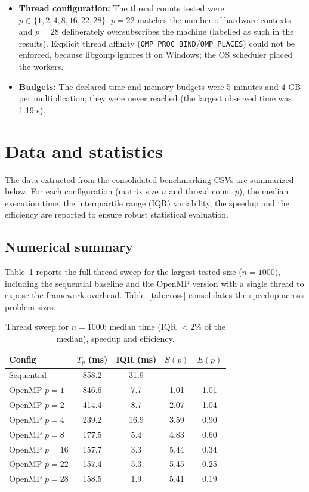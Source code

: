\documentclass[12pt,a4paper]{article}
\begin{document}
\begin{itemize}
2 low-power E-cores = 16 physical cores / 22 hardware threads, P-cores up to
4.8 GHz; RAM 32 GB; OS Windows 11; compiler gcc 16.2.0 (MSYS2) with flags
\texttt{-O3 -fopenmp}. Python 3.12 was used for input generation and
analysis (numpy, pandas, matplotlib).
\item \textbf{Thread configuration:} The thread counts tested were
$p \in \{1, 2, 4, 8, 16, 22, 28\}$: $p = 22$ matches the number of hardware
contexts and $p = 28$ deliberately oversubscribes the machine (labelled as
such in the results). Explicit thread affinity
(\texttt{OMP\_PROC\_BIND}/\texttt{OMP\_PLACES}) could not be enforced,
because libgomp ignores it on Windows; the OS scheduler placed the workers.
\item \textbf{Budgets:} The declared time and memory budgets were 5 minutes
and 4 GB per multiplication; they were never reached (the largest observed
time was 1.19 s).
\end{itemize}

\section{Data and statistics}
\label{sec:data}

The data extracted from the consolidated benchmarking CSVs are summarized
below. For each configuration (matrix size $n$ and thread count $p$), the
median execution time, the interquartile range (IQR) variability, the
speedup and the efficiency are reported to ensure robust statistical
evaluation.

\subsection{Numerical summary}
\label{sec:numsummary}

Table~\ref{tab:sweep} reports the full thread sweep for the largest tested
size ($n = 1000$), including the sequential baseline and the OpenMP version
with a single thread to expose the framework overhead.
Table~\ref{tab:cross} consolidates the speedup across problem sizes.

\begin{table}[h]
\centering
\caption{Thread sweep for $n = 1000$: median time (IQR $< 2\%$ of the
median), speedup and efficiency.}
\label{tab:sweep}
\begin{tabular}{@{}lcccc@{}}
\toprule
Config & $T_p$ (ms) & IQR (ms) & $S(p)$ & $E(p)$ \\
\midrule
Sequential & 858.2 & 31.9 & --- & --- \\
OpenMP $p=1$ & 846.6 & 7.7 & 1.01 & 1.01 \\
OpenMP $p=2$ & 414.4 & 8.7 & 2.07 & 1.04 \\
OpenMP $p=4$ & 239.2 & 16.9 & 3.59 & 0.90 \\
OpenMP $p=8$ & 177.5 & 5.4 & 4.83 & 0.60 \\
OpenMP $p=16$ & 157.7 & 3.3 & 5.44 & 0.34 \\
OpenMP $p=22$ & 157.4 & 5.3 & 5.45 & 0.25 \\
OpenMP $p=28$ & 158.5 & 1.9 & 5.41 & 0.19 \\
\bottomrule
\end{tabular}
\end{table}
\end{document}
